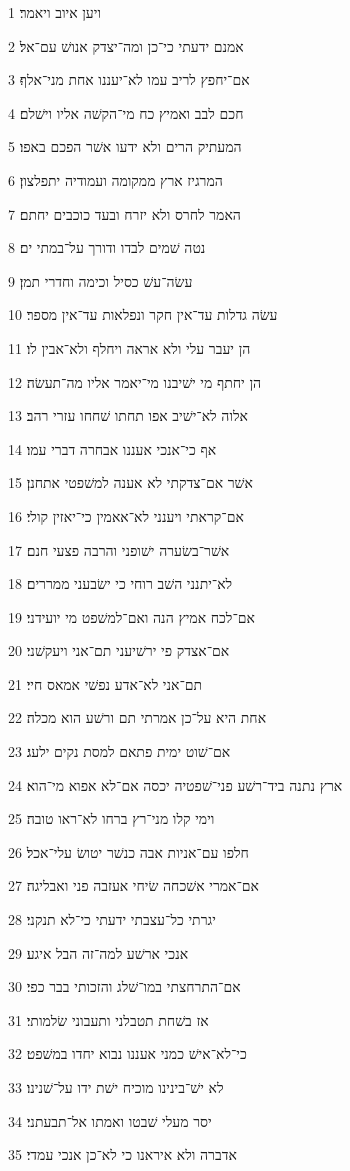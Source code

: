 \par 1 ויען איוב ויאמר׃
\par 2 אמנם ידעתי כי־כן ומה־יצדק אנושׁ עם־אל׃
\par 3 אם־יחפץ לריב עמו לא־יעננו אחת מני־אלף׃
\par 4 חכם לבב ואמיץ כח מי־הקשׁה אליו וישׁלם׃
\par 5 המעתיק הרים ולא ידעו אשׁר הפכם באפו׃
\par 6 המרגיז ארץ ממקומה ועמודיה יתפלצון׃
\par 7 האמר לחרס ולא יזרח ובעד כוכבים יחתם׃
\par 8 נטה שׁמים לבדו ודורך על־במתי ים׃
\par 9 עשׂה־עשׁ כסיל וכימה וחדרי תמן׃
\par 10 עשׂה גדלות עד־אין חקר ונפלאות עד־אין מספר׃
\par 11 הן יעבר עלי ולא אראה ויחלף ולא־אבין לו׃
\par 12 הן יחתף מי ישׁיבנו מי־יאמר אליו מה־תעשׂה׃
\par 13 אלוה לא־ישׁיב אפו תחתו שׁחחו עזרי רהב׃
\par 14 אף כי־אנכי אעננו אבחרה דברי עמו׃
\par 15 אשׁר אם־צדקתי לא אענה למשׁפטי אתחנן׃
\par 16 אם־קראתי ויענני לא־אאמין כי־יאזין קולי׃
\par 17 אשׁר־בשׂערה ישׁופני והרבה פצעי חנם׃
\par 18 לא־יתנני השׁב רוחי כי ישׂבעני ממררים׃
\par 19 אם־לכח אמיץ הנה ואם־למשׁפט מי יועידני׃
\par 20 אם־אצדק פי ירשׁיעני תם־אני ויעקשׁני׃
\par 21 תם־אני לא־אדע נפשׁי אמאס חיי׃
\par 22 אחת היא על־כן אמרתי תם ורשׁע הוא מכלה׃
\par 23 אם־שׁוט ימית פתאם למסת נקים ילעג׃
\par 24 ארץ נתנה ביד־רשׁע פני־שׁפטיה יכסה אם־לא אפוא מי־הוא׃
\par 25 וימי קלו מני־רץ ברחו לא־ראו טובה׃
\par 26 חלפו עם־אניות אבה כנשׁר יטושׂ עלי־אכל׃
\par 27 אם־אמרי אשׁכחה שׂיחי אעזבה פני ואבליגה׃
\par 28 יגרתי כל־עצבתי ידעתי כי־לא תנקני׃
\par 29 אנכי ארשׁע למה־זה הבל איגע׃
\par 30 אם־התרחצתי במו־שׁלג והזכותי בבר כפי׃
\par 31 אז בשׁחת תטבלני ותעבוני שׂלמותי׃
\par 32 כי־לא־אישׁ כמני אעננו נבוא יחדו במשׁפט׃
\par 33 לא ישׁ־בינינו מוכיח ישׁת ידו על־שׁנינו׃
\par 34 יסר מעלי שׁבטו ואמתו אל־תבעתני׃
\par 35 אדברה ולא איראנו כי לא־כן אנכי עמדי׃

